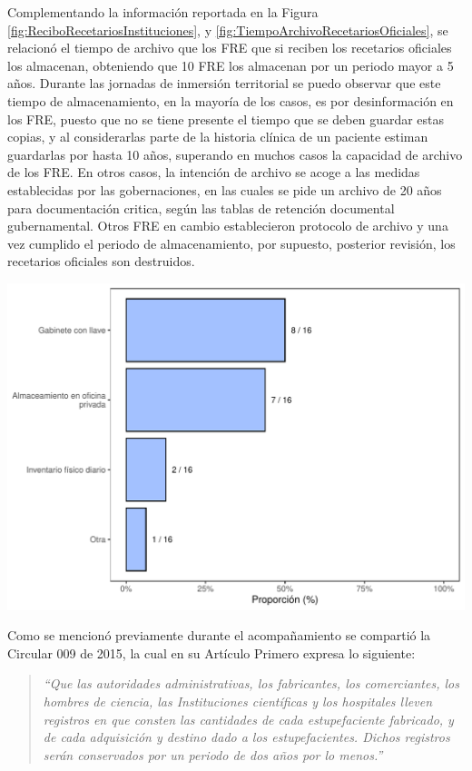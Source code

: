 \documentclass[
]{book}
\begin{document}
Complementando la información reportada en la Figura \ref{fig:ReciboRecetariosInstituciones}, y \ref{fig:TiempoArchivoRecetariosOficiales}, se relacionó el tiempo de archivo que los FRE que si reciben los recetarios oficiales los almacenan, obteniendo que 10 FRE los almacenan por un periodo mayor a 5 años. Durante las jornadas de inmersión territorial se puedo observar que este tiempo de almacenamiento, en la mayoría de los casos, es por desinformación en los FRE, puesto que no se tiene presente el tiempo que se deben guardar estas copias, y al considerarlas parte de la historia clínica de un paciente estiman guardarlas por hasta 10 años, superando en muchos casos la capacidad de archivo de los FRE. En otros casos, la intención de archivo se acoge a las medidas establecidas por las gobernaciones, en las cuales se pide un archivo de 20 años para documentación critica, según las tablas de retención documental gubernamental. Otros FRE en cambio establecieron protocolo de archivo y una vez cumplido el periodo de almacenamiento, por supuesto, posterior revisión, los recetarios oficiales son destruidos.

\includegraphics[width=0.85\linewidth]{InformeFinal_files/figure-latex/MedidasSeguridad-Almacenamiento-1}

Como se mencionó previamente durante el acompañamiento se compartió la Circular 009 de 2015, la cual en su Artículo Primero expresa lo siguiente:

\begin{quote}
\emph{``Que las autoridades administrativas, los fabricantes, los comerciantes, los hombres de ciencia, las Instituciones científicas y los hospitales lleven registros en que consten las cantidades de cada estupefaciente fabricado, y de cada adquisición y destino dado a los estupefacientes. Dichos registros serán conservados por un periodo de dos años por lo menos.''}
\end{quote}
\end{document}
